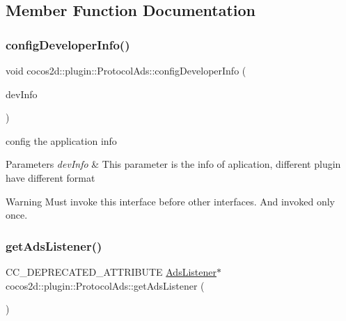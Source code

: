 \subsection{Member Function Documentation}
\mbox{\label{classcocos2d_1_1plugin_1_1ProtocolAds_a4fc710e3937e28cbd03e2820b7517f9c}} 
\subsubsection{\texorpdfstring{config\+Developer\+Info()}{configDeveloperInfo()}}
{\footnotesize\ttfamily void cocos2d\+::plugin\+::\+Protocol\+Ads\+::config\+Developer\+Info (\begin{DoxyParamCaption}\item[{T\+Ads\+Developer\+Info}]{dev\+Info }\end{DoxyParamCaption})}



config the application info 


\begin{DoxyParams}{Parameters}
{\em dev\+Info} & This parameter is the info of aplication, different plugin have different format \\
\hline
\end{DoxyParams}
\begin{DoxyWarning}{Warning}
Must invoke this interface before other interfaces. And invoked only once. 
\end{DoxyWarning}
\mbox{\label{classcocos2d_1_1plugin_1_1ProtocolAds_a283f33d33936b8fd0b8267b65e757ec0}} 
\subsubsection{\texorpdfstring{get\+Ads\+Listener()}{getAdsListener()}}
{\footnotesize\ttfamily C\+C\+\_\+\+D\+E\+P\+R\+E\+C\+A\+T\+E\+D\+\_\+\+A\+T\+T\+R\+I\+B\+U\+TE \hyperlink{classcocos2d_1_1plugin_1_1AdsListener}{Ads\+Listener}$\ast$ cocos2d\+::plugin\+::\+Protocol\+Ads\+::get\+Ads\+Listener (\begin{DoxyParamCaption}{ }\end{DoxyParamCaption})\hspace{0.3cm}{\ttfamily [inline]}}



